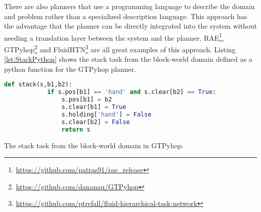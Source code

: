 
\begin{table}[H]
    \centering
    \caption{The stack task from the block-world domain in different formats.}
    \label{tab:my-table}
\end{table}



There are also planners that use a programming language to describe the domain and problem rather than a specialized description language. This approach has the advantage that the planner can be directly integrated into the system without needing a translation layer between the system and the planner. RAE\footnote{\url{https://github.com/patras91/rae_release}}, GTPyhop\footnote{\url{https://github.com/dananau/GTPyhop}} and FluidHTN\footnote{\url{https://github.com/ptrefall/fluid-hierarchical-task-network}} are all great examples of this approach. Listing \ref{lst:StackPython} shows the stack task from the block-world domain defined as a python function for the GTPyhop planner.

\begin{Listing}
    \begin{lstlisting}[language=Python]
        def stack(s,b1,b2):
            if s.pos[b1] == 'hand' and s.clear[b2] == True:
                s.pos[b1] = b2
                s.clear[b1] = True
                s.holding['hand'] = False
                s.clear[b2] = False
                return s
    \end{lstlisting}
    \caption{The stack task from the block-world domain in GTPyhop.}
    \label{lst:StackPython}
\end{Listing}